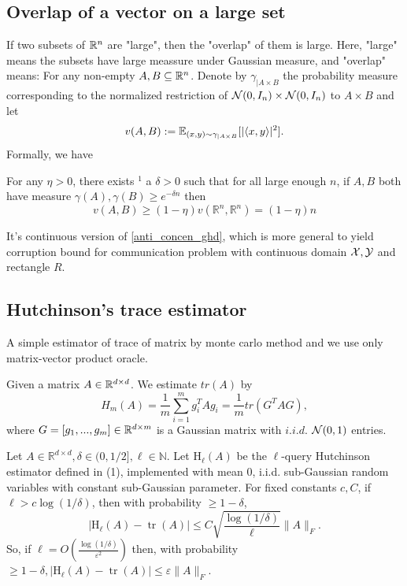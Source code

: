 \documentclass[10pt]{book}
\begin{document}
\subsection{Overlap of a vector on a large set}
If two subsets of $\mathbb{R}^n$ are "large", then the "overlap" of them is large. Here, "large" means the subsets have large meassure under Gaussian measure, and "overlap" means: For any non-empty $A,B\subseteq \mathbb{R}^n$. Denote by $\gamma_{|A\times B}$ the probability measure corresponding to the normalized restriction of $\mathcal{N}(0,I_n)\times \mathcal{N}(0,I_n)$ to $A\times B$ and let
\[
v(A,B):=\mathbb{E}_{(x,y)\sim\gamma_{|A\times B}}[|\langle x,y \rangle|^2].
\]
Formally, we have
\begin{thm}
\label{large_overlap}
For any $\eta>0$, there exists ${ }^1$ a $\delta>0$ such that for all large enough $n$, if $A, B$ both have measure $\gamma(A), \gamma(B) \geq e^{-\delta n}$ then
$$
v(A, B) \geq(1-\eta) v\left(\mathbb{R}^n, \mathbb{R}^n\right)=(1-\eta) n
$$
\end{thm}
It's continuous version of \eqref{anti_concen_ghd}, which is more general to yield corruption bound for communication problem with continuous domain $\mathcal{X},\mathcal{Y}$ and rectangle $R$.
\subsection{Hutchinson's trace estimator}
A simple estimator of trace of matrix by monte carlo method and we use only matrix-vector product oracle.
\begin{defn}
\label{hutchinson_est}
Given a matrix $A\in\mathbb{R}^{d\times d}$. We estimate $tr(A)$ by
\[
H_m(A) = \frac{1}{m}\sum_{i=1}^m g_i^T A g_i = \frac{1}{m}tr(G^T A G),
\]
where $G=[g_1,...,g_m]\in\mathbb{R}^{d\times m}$ is a Gaussian matrix with $i.i.d.$ $\mathcal{N}(0,1)$ entries.
\end{defn}

\begin{thm}
\label{hutchinson_bound}
Let $A \in \mathbb{R}^{d \times d}, \delta \in(0,1 / 2], \ell \in \mathbb{N}$. Let $\mathrm{H}_{\ell}(A)$ be the $\ell$-query Hutchinson estimator defined in (1), implemented with mean 0, i.i.d. sub-Gaussian random variables with constant sub-Gaussian parameter. For fixed constants $c, C$, if $\ell>c \log (1 / \delta)$, then with probability $\geq 1-\delta$,
$$
\left|\mathrm{H}_{\ell}(A)-\operatorname{tr}(A)\right| \leq C \sqrt{\frac{\log (1 / \delta)}{\ell}}\|A\|_F .
$$
So, if $\ell=O\left(\frac{\log (1 / \delta)}{\varepsilon^2}\right)$ then, with probability $\geq 1-\delta,\left|\mathrm{H}_{\ell}(A)-\operatorname{tr}(A)\right| \leq \varepsilon\|A\|_F$.
\end{thm}
\end{document}
